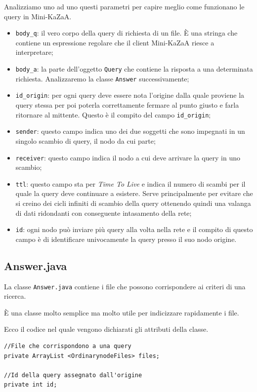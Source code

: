 Analizziamo uno ad uno questi parametri per capire meglio come funzionano le query in Mini-KaZaA.
\begin{itemize}
 \item \verb|body_q|:
il vero corpo della query di richiesta di un file. \`{E} una stringa che contiene un
espressione regolare che il client Mini-KaZaA riesce a interpretare;

 \item \verb|body_a|:
la parte dell'oggetto \verb|Query| che contiene la risposta a una determinata richiesta. Analizzaremo la classe
\verb|Answer| successivamente;

 \item \verb|id_origin|:
per ogni query deve essere nota l'origine dalla quale proviene la query stessa per poi poterla correttamente fermare
al punto giusto e farla ritornare al mittente. Questo è il compito del campo \verb|id_origin|;

 \item \verb|sender|: 
questo campo indica uno dei due soggetti che sono impegnati in un singolo scambio di query, il nodo da cui parte;

 \item \verb|receiver|:
questo campo indica il nodo a cui deve arrivare la query in uno scambio;

 \item \verb|ttl|:
questo campo sta per \emph{Time To Live} e indica il numero di scambi per il quale la query deve continuare a esistere.
Serve principalmente per evitare che si creino dei cicli infiniti di scambio della query ottenendo quindi una valanga
di dati ridondanti con conseguente intasamento della rete;

 \item \verb|id|:
ogni nodo può inviare più query alla volta nella rete e il compito di questo campo è di identificare univocamente la
query presso il suo nodo origine.
\end{itemize}

\subsection{Answer.java}
La classe \verb|Answer.java| contiene i file che possono corrispondere ai criteri di una ricerca. 

\`{E} una classe molto semplice ma molto utile per indicizzare rapidamente i file.

Ecco il codice nel quale vengono dichiarati gli attributi della classe.
\newline
\begin{lstlisting}
//File che corrispondono a una query
private ArrayList <OrdinarynodeFiles> files;

//Id della query assegnato dall'origine
private int id;
\end{lstlisting}


